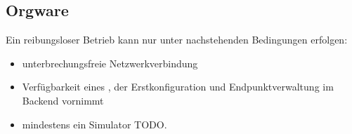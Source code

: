 \subsection{Orgware}
Ein reibungsloser Betrieb kann nur unter nachstehenden Bedingungen erfolgen:
\begin{itemize}
    \item unterbrechungsfreie Netzwerkverbindung
    \item Verfügbarkeit eines , der Erstkonfiguration und \gls{Endpunkt}verwaltung im Backend vornimmt
    \item mindestens ein Simulator TODO.
\end{itemize}

